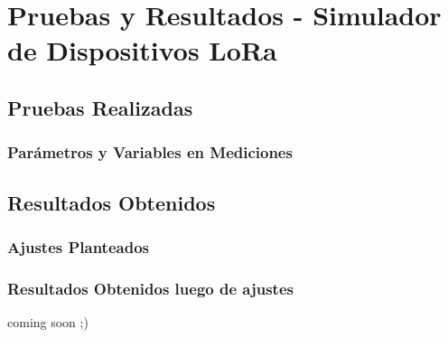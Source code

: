 \chapter{Pruebas y Resultados - Simulador de Dispositivos LoRa}
\section{Pruebas Realizadas}
\subsection{Parámetros y Variables en Mediciones}
\section{Resultados Obtenidos}
\subsection{Ajustes Planteados}
\subsection{Resultados Obtenidos luego de ajustes}
coming soon ;)